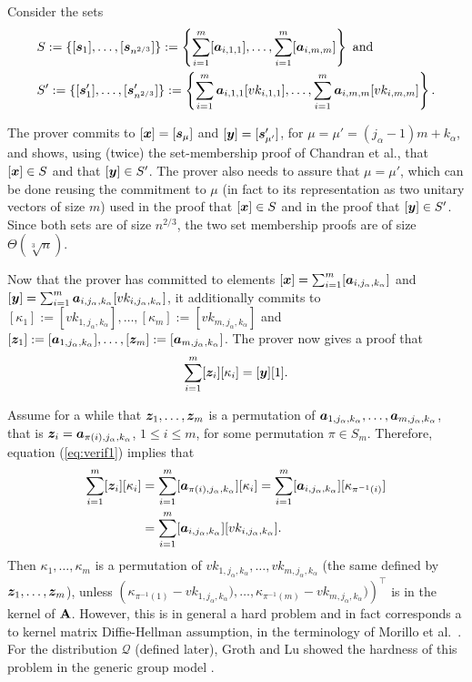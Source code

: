 Consider the sets
\begin{align*}
&S:=\{[{\boldsymbol{s}}_1],\ldots,[{\boldsymbol{s}}_{n^{2/3}}]\}:=\left\{\sum_{i=1}^{m}[{\boldsymbol{a}}_{i,1,1}],\ldots,\sum_{i=1}^{m}[{\boldsymbol{a}}_{i,m,m}]\right\}\text{ and }\\
&S':=\{[{\boldsymbol{s}}'_1],\ldots,[{\boldsymbol{s}}'_{n^{2/3}}]\}:=\left\{\sum_{i=1}^{m}{\boldsymbol{a}}_{i,1,1}[vk_{i,1,1}],\ldots,\sum_{i=1}^{m}{\boldsymbol{a}}_{i,m,m}[vk_{i,m,m}]\right\}.
\end{align*}

The prover commits to $[{\boldsymbol{x}}]=[{\boldsymbol{s}}_\mu]$ and $[{\boldsymbol{y}}]=[{\boldsymbol{s}}'_{\mu'}]$, for $\mu=\mu'=(j_\alpha-1)m+k_\alpha$, and shows, using (twice) the set-membership proof of Chandran et al., that $[{\boldsymbol{x}}]\in S$ and that $[{\boldsymbol{y}}]\in S'$.
The prover also needs to assure that $\mu=\mu'$, which can be done reusing the commitment to $\mu$ (in fact to its representation as two unitary vectors of size $m$) used in the proof that $[{\boldsymbol{x}}]\in S$ and in the proof that $[{\boldsymbol{y}}]\in S'$. Since both sets are of size $n^{2/3}$, the two set membership proofs are of size $\Theta(\sqrt[3]{n})$.
 
Now that the prover has committed to elements $[{\boldsymbol{x}}]=\sum_{i=1}^{m}[{\boldsymbol{a}}_{i,j_\alpha,k_\alpha}]$ and $[{\boldsymbol{y}}]=\sum_{i=1}^{m}{\boldsymbol{a}}_{i,j_\alpha,k_\alpha}[vk_{i,j_\alpha,k_\alpha}]$, it additionally commits to $[\kappa_1]:=[vk_{1,j_\alpha,k_\alpha}],\allowbreak\ldots,\allowbreak[\kappa_m]:=[vk_{m,j_\alpha,k_\alpha}]$ and $[{\boldsymbol{z}}_1]:=[{\boldsymbol{a}}_{1,j_\alpha,k_\alpha}],\ldots,[{\boldsymbol{z}}_m]:=[{\boldsymbol{a}}_{m,j_\alpha,k_\alpha}]$. The prover now gives a proof that
\begin{equation}
\sum_{i=1}^{m}[{\boldsymbol{z}}_i][\kappa_i]=[{\boldsymbol{y}}][1]. \label{eq:verif1}
\end{equation}

Assume for a while that ${\boldsymbol{z}}_1,\ldots,{\boldsymbol{z}}_m$ is a permutation of ${\boldsymbol{a}}_{1,j_\alpha,k_\alpha},\ldots,{\boldsymbol{a}}_{m,j_\alpha,k_\alpha}$, that is ${\boldsymbol{z}}_i={\boldsymbol{a}}_{\pi(i),j_\alpha,k_\alpha}$, $1\leq i\leq m$, for some permutation $\pi\in S_m$. Therefore, equation (\ref{eq:verif1}) implies that
\begin{align*}
\sum_{i=1}^{m}[{\boldsymbol{z}}_i][\kappa_i]&=\sum_{i=1}^{m}[{\boldsymbol{a}}_{\pi(i),j_\alpha,k_\alpha}][\kappa_i]=\sum_{i=1}^{m}[{\boldsymbol{a}}_{i,j_\alpha,k_\alpha}][\kappa_{\pi^{-1}(i)}]\\
&=\sum_{i=1}^{m}[{\boldsymbol{a}}_{i,j_\alpha,k_\alpha}][vk_{i,j_\alpha,k_\alpha}].
\end{align*}
Then $\kappa_1,\ldots,\kappa_m$ is a permutation of $vk_{1,j_\alpha,k_\alpha},\ldots,vk_{m,j_\alpha,k_\alpha}$ (the same defined by ${\boldsymbol{z}}_1,\ldots,{\boldsymbol{z}}_m$), unless $(\kappa_{\pi^{-1}(1)}-{vk_{1,j_\alpha,k_\alpha}),\ldots,\kappa_{\pi^{-1}(m)}-vk_{m,j_\alpha,k_\alpha})})^\top$ is in the kernel of $\mathbf{{A}}$. However, this is in general a hard problem and in fact corresponds a to kernel matrix Diffie-Hellman assumption, in the terminology of Morillo et al.~\cite{AC:MorRafVil16}.
For the distribution $\mathcal{Q}$ (defined later), Groth and Lu showed the hardness of this problem in the generic group model \cite{AC:GroLu07}.

